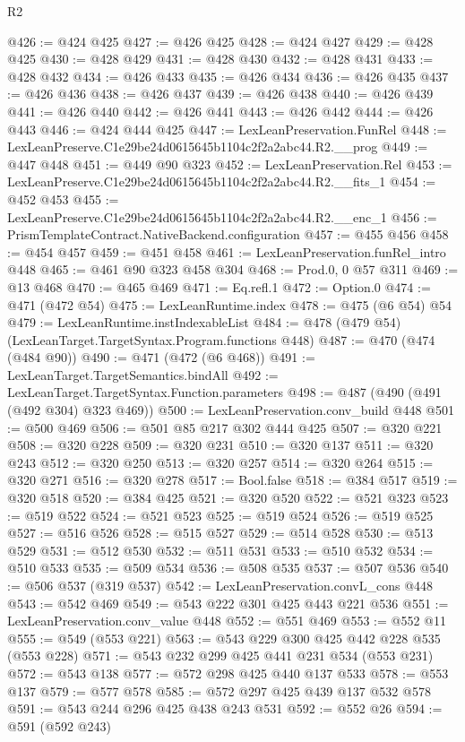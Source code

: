 \begin{lexlean}{R2}
\begin{coremodule}
@426 := @424 @425
@427 := @426 @425
@428 := @424 @427
@429 := @428 @425
@430 := @428 @429
@431 := @428 @430
@432 := @428 @431
@433 := @428 @432
@434 := @426 @433
@435 := @426 @434
@436 := @426 @435
@437 := @426 @436
@438 := @426 @437
@439 := @426 @438
@440 := @426 @439
@441 := @426 @440
@442 := @426 @441
@443 := @426 @442
@444 := @426 @443
@446 := @424 @444 @425
@447 := LexLeanPreservation.FunRel
@448 := LexLeanPreserve.C1e29be24d0615645b1104c2f2a2abc44.R2.__prog
@449 := @447 @448
@451 := @449 @90 @323
@452 := LexLeanPreservation.Rel
@453 := LexLeanPreserve.C1e29be24d0615645b1104c2f2a2abc44.R2.__fits_1
@454 := @452 @453
@455 := LexLeanPreserve.C1e29be24d0615645b1104c2f2a2abc44.R2.__enc_1
@456 := PrismTemplateContract.NativeBackend.configuration
@457 := @455 @456
@458 := @454 @457
@459 := @451 @458
@461 := LexLeanPreservation.funRel_intro @448
@465 := @461 @90 @323 @458 @304
@468 := Prod.{0, 0} @57 @311
@469 := @13 @468
@470 := @465 @469
@471 := Eq.refl.{1}
@472 := Option.{0}
@474 := @471 (@472 @54)
@475 := LexLeanRuntime.index
@478 := @475 (@6 @54) @54
@479 := LexLeanRuntime.instIndexableList
@484 := @478 (@479 @54) (LexLeanTarget.TargetSyntax.Program.functions @448)
@487 := @470 (@474 (@484 @90))
@490 := @471 (@472 (@6 @468))
@491 := LexLeanTarget.TargetSemantics.bindAll
@492 := LexLeanTarget.TargetSyntax.Function.parameters
@498 := @487 (@490 (@491 (@492 @304) @323 @469))
@500 := LexLeanPreservation.conv_build @448
@501 := @500 @469
@506 := @501 @85 @217 @302 @444 @425
@507 := @320 @221
@508 := @320 @228
@509 := @320 @231
@510 := @320 @137
@511 := @320 @243
@512 := @320 @250
@513 := @320 @257
@514 := @320 @264
@515 := @320 @271
@516 := @320 @278
@517 := Bool.false
@518 := @384 @517
@519 := @320 @518
@520 := @384 @425
@521 := @320 @520
@522 := @521 @323
@523 := @519 @522
@524 := @521 @523
@525 := @519 @524
@526 := @519 @525
@527 := @516 @526
@528 := @515 @527
@529 := @514 @528
@530 := @513 @529
@531 := @512 @530
@532 := @511 @531
@533 := @510 @532
@534 := @510 @533
@535 := @509 @534
@536 := @508 @535
@537 := @507 @536
@540 := @506 @537 (@319 @537)
@542 := LexLeanPreservation.convL_cons @448
@543 := @542 @469
@549 := @543 @222 @301 @425 @443 @221 @536
@551 := LexLeanPreservation.conv_value @448
@552 := @551 @469
@553 := @552 @11
@555 := @549 (@553 @221)
@563 := @543 @229 @300 @425 @442 @228 @535 (@553 @228)
@571 := @543 @232 @299 @425 @441 @231 @534 (@553 @231)
@572 := @543 @138
@577 := @572 @298 @425 @440 @137 @533
@578 := @553 @137
@579 := @577 @578
@585 := @572 @297 @425 @439 @137 @532 @578
@591 := @543 @244 @296 @425 @438 @243 @531
@592 := @552 @26
@594 := @591 (@592 @243)

\end{coremodule}
\end{lexlean}
